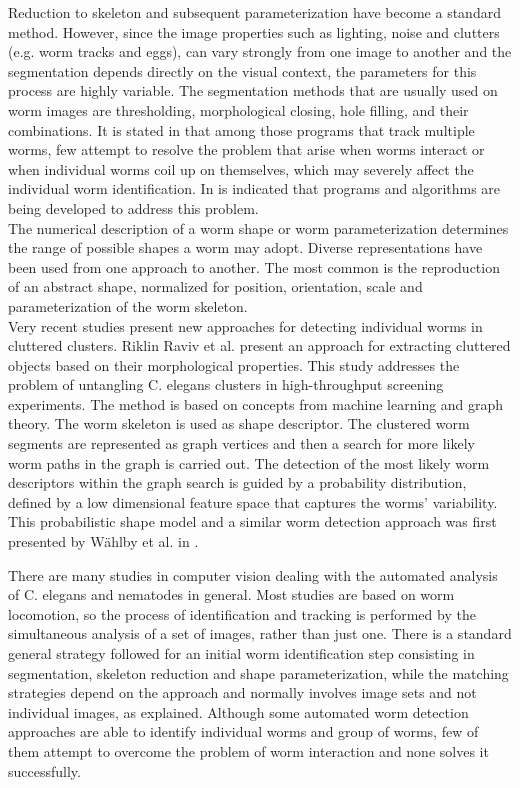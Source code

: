 Reduction to skeleton and subsequent parameterization have become a standard method. 
However, since the image properties such as lighting, noise and clutters 
(e.g. worm tracks and eggs), can vary strongly from one image to another and 
the segmentation depends directly on the visual context, the  
parameters for this process are highly variable. The segmentation methods 
that are usually used 
on worm images are thresholding, morphological closing, 
hole filling, and their combinations.
It is stated in \cite{automated} that among those programs that track 
multiple worms, few attempt to resolve the problem that arise when 
worms interact or when individual worms coil up on themselves, which may
severely affect the individual worm identification. In \cite{huang} is indicated
that programs and algorithms are being developed to address this problem.\\

The  numerical description of a worm shape or worm parameterization 
determines the range of possible shapes a worm may adopt. Diverse 
representations have been used from one approach to another. The 
most common is the reproduction of an abstract shape, normalized for position, 
orientation, scale and parameterization of the 
worm skeleton.\\

Very recent studies present new approaches for detecting individual worms
in cluttered clusters. Riklin Raviv et al. \cite{individual1} present an approach for
 extracting cluttered objects based on their morphological properties. This study addresses
the problem of untangling C. elegans clusters in high-throughput screening experiments.
The method is based on concepts from machine learning and graph theory. The worm
skeleton is used as shape descriptor. 
The clustered worm segments are represented
as graph vertices and then a search for more likely worm paths in the graph 
is carried out. The detection of the most likely worm descriptors within the graph
search is guided by a probability distribution, defined by a low dimensional feature 
space that captures the worms' variability. This probabilistic shape model and a 
similar worm detection approach was first
presented by W\"{a}hlby et al. in \cite{individual2}.


There are many studies in computer vision dealing with the automated
analysis of C. elegans and nematodes in general. Most studies are
based on worm locomotion, so the process of identification and 
tracking is performed by the simultaneous analysis of a set of images, rather
than just one. There is a standard general strategy followed for an initial
worm identification step consisting in segmentation, skeleton reduction and
shape parameterization, while the matching strategies depend on the approach
and normally involves image sets and not individual images, as explained.
Although some automated worm detection approaches are able to identify
individual worms and group of worms, few of them attempt to overcome the 
problem of worm interaction and none solves it successfully.


